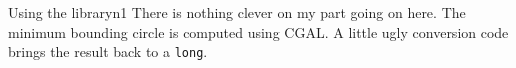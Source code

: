 \documentclass{writeup}
\begin{document}
\begin{solutions}
  \begin{solution}{Using the library}{n}{1}
    There is nothing clever on my part going on here.
    The minimum bounding circle is computed using CGAL.
    A little ugly conversion code brings the result back to a \texttt{long}.
  \end{solution}
\end{solutions}
\end{document}
